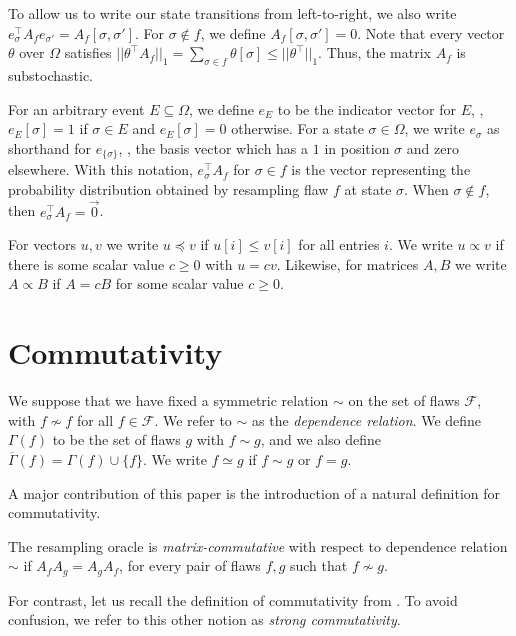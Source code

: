 \documentclass{toc}
\begin{document}
To allow us to write our state transitions from left-to-right, we also write $e_{\sigma}^{\top} A_f e_{\sigma'} = A_f[\sigma, \sigma']$.  For $\sigma \notin f$, we define $A_f[\sigma, \sigma'] = 0$.   Note that %
every  %
vector $\theta$ over $\Omega$ satisfies $|| \theta^{\top} A_f ||_1 = \sum_{\sigma \in f} \theta[\sigma] \leq || \theta^{\top} ||_1$. Thus, the matrix $A_f$ is substochastic. 



For an arbitrary event $E \subseteq \Omega$, we define $e_E$ to be the indicator vector for $E$, \ie, $e_E[\sigma] = 1$ if $\sigma \in E$ and $e_E[\sigma] = 0$ otherwise. For a state $\sigma \in \Omega$, we write $e_{\sigma}$ as shorthand for $e_{ \{ \sigma \}}$, \ie, the basis vector which has a $1$ in position $\sigma$ and zero elsewhere. With this notation,  $e_{\sigma}^{\top} A_f$ for $\sigma \in f$ is the vector representing the probability distribution obtained by resampling flaw $f$ at state $\sigma$. When $\sigma \notin f$, then $e_{\sigma}^{\top} A_f = \vec 0$.

For vectors $u, v$ we write $u \preceq v$ if $u[i] \leq v[i]$ for all entries $i$. We write $u \propto v$ if there is some scalar value 
%
$c \geq 0$ %
%
%
with $u = c v$. Likewise, for matrices $A, B$ we write $A \propto B$ if $A = c B$ for some scalar value 
%
$c \geq  0$.


\section{Commutativity}
\label{Background} 
 We suppose that we have fixed a symmetric relation $\sim$ on 
 the set of flaws %
 $\mathcal F$, %
%
%
with $f \not \sim f$ %
for all $f\in {\mathcal F}$.  %
We refer to $\sim$ as the \emph{dependence relation}. We define $ \Gamma(f)$ to be the set of flaws $g$ with $f \sim g$, and we also define $\overline \Gamma(f) = \Gamma(f) \cup  \{f \}$. We write $f \simeq g$ if $f \sim g$ or $f = g$.

%
A  %
major contribution of this paper is %
the introduction of  %
a natural definition for 
commutativity.  %

\begin{definition}\label{commutative_algos}
The resampling oracle is \emph{matrix-commutative} with respect to  dependence relation $\sim$ if  $A_f A_g = A_g A_f$, for every pair of flaws $f,g$ such that $f \nsim g$. 
\end{definition}

For contrast, let us recall the definition of commutativity from \cite{Kolmofocs}. To avoid confusion, we refer to this other notion as \emph{strong commutativity}.
\end{document}
